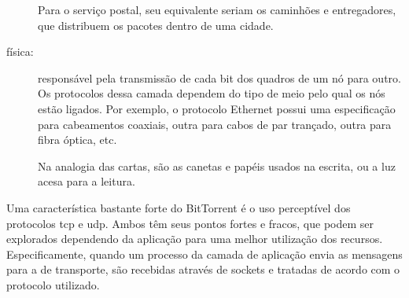 \begin{description}
        Para o serviço postal, seu equivalente seriam os caminhões e entregadores, que
        distribuem os pacotes dentro de uma cidade.

    \item[física:] responsável pela transmissão de cada bit dos quadros de um nó para
        outro. Os protocolos dessa camada dependem do tipo de meio pelo qual os nós
        estão ligados. Por exemplo, o protocolo Ethernet possui uma especificação para
        cabeamentos coaxiais, outra para cabos de par trançado, outra para fibra óptica,
        etc.

        Na analogia das cartas, são as canetas e papéis usados na escrita, ou a luz
        acesa para a leitura.
\end{description}

Uma característica bastante forte do BitTorrent é o uso perceptível dos protocolos
\gls*{tcp} e \gls*{udp}. Ambos têm seus pontos fortes e fracos, que podem ser explorados
dependendo da aplicação para uma melhor utilização dos recursos. Especificamente, quando um processo da camada de aplicação envia as mensagens para a de transporte, são
recebidas através de \glspl{socket} e tratadas de acordo com o protocolo utilizado.

\begin{comment}
Aqui vou explicar o que são os protocolos de rede TCP e UDP, apontar suas diferenças e
mostrar os motivos pelos quais o UDP é preferido ao TCP no uso de endereços de
\gls*{announce} de \glspl*{tracker}.
\end{comment}





